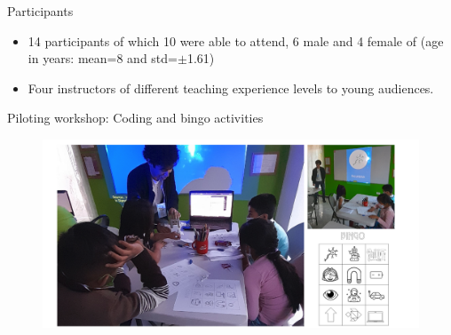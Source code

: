 {

\begin{frame}{Participants}

\begin{itemize}
\item 14 participants of which 10 were able to attend, 6 male and 4 female of (age in years: mean=8 and std=$\pm$1.61)     
\item Four instructors of different teaching experience levels to young audiences.
\end{itemize}

\end{frame}
}




{

\begin{frame}{Piloting workshop: Coding and bingo activities}
      \begin{figure}
        \centering
        \includegraphics[width=1.0\textwidth]{./figures/pilot-workshop-a/outputs/drawing-v00.png}
      \end{figure}
\end{frame}
}



